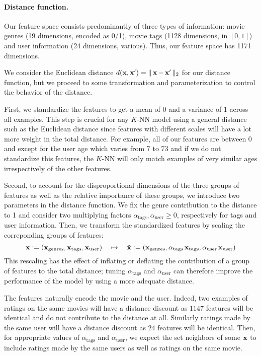 \documentclass[bj, preprint]{imsart}
\begin{document}
\paragraph{Distance function.}\label{par:method.models.knn.distance}

Our feature space consists predominantly of three types of information: movie genres (19 dimensions, encoded as 0/1), movie tags (1128 dimensions, in $[0,1]$) and user information (24 dimensions, various). Thus, our feature space has \num{1171} dimensions. 

We consider the Euclidean distance $d(\operatorname{\mathbf x},\operatorname{\mathbf x}')=\Vert\operatorname{\mathbf x}-\operatorname{\mathbf x}'\Vert_2$ for our distance function, but we proceed to some transformation and parameterization to control the behavior of the distance. 

First, we standardize the features to get a mean of 0 and a variance of 1 across all examples. This step is crucial for any $K$-NN model using a general distance such as the Euclidean distance since features with different scales will have a lot more weight in the total distance. For example, all of our features are between 0 and except for the user age which varies from 7 to 73 and if we do not standardize this features, the $K$-NN will only match examples of very similar ages irrespectively of the other features.

Second, to account for the disproportional dimensions of the three groups of features as well as the relative importance of these groups, we introduce two parameters in the distance function. We fix the genre contribution to the distance to 1 and consider two multiplying factors $\alpha_\text{tags}, \alpha_\text{user}\geqslant 0$, respectively for tags and user information. Then, we transform the standardized features by scaling the correponding groups of features:
\begin{equation*}
	\bx:=(\bx_\text{genres}, \bx_\text{tags}, \bx_\text{user})
	\quad\mapsto\quad
	\tilde{\bx}:=(\bx_\text{genres}, \alpha_\text{tags}\bx_\text{tags}, \alpha_\text{user}\bx_\text{user})
\end{equation*}
This rescaling has the effect of inflating or deflating the contribution of a group of features to the total distance; tuning $\alpha_\text{tags}$ and $\alpha_\text{user}$ can therefore improve the performance of the model by using a more adequate distance.

The features naturally encode the movie and the user. Indeed, two examples of ratings on the same movies will have a distance discount as $1147$ features will be identical and do not contribute to the distance at all. Similarly ratings made by the same user will have a distance discount as $24$ features will be identical. Then, for appropriate values of $\alpha_\text{tags}$ and $\alpha_\text{user}$, we expect the set neighbors of some $\operatorname{\mathbf x}$ to include ratings made by the same users as well as ratings on the same movie.
\end{document}

